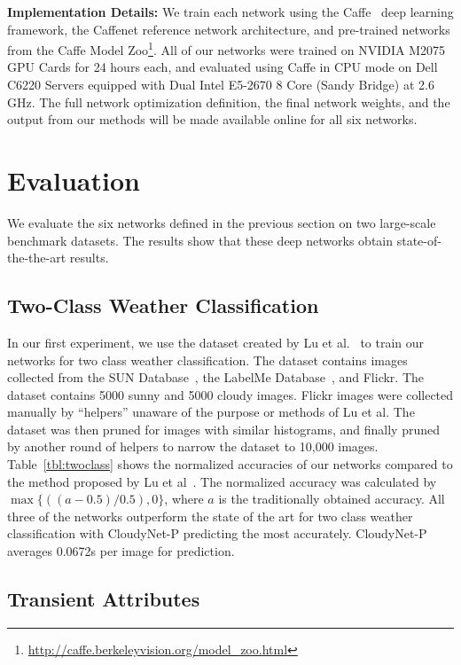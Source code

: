 \documentclass{article}
\newcommand{\tblref}[1]{Table~\ref{tbl:#1}}
\begin{document}
\textbf{Implementation Details:} We train each network using the
Caffe~\cite{caffe14} deep learning framework, the Caffenet
reference network architecture, and pre-trained networks from the
Caffe Model
Zoo\footnote{\url{http://caffe.berkeleyvision.org/model_zoo.html}}.
All of our networks were trained on NVIDIA M2075 GPU Cards for 24 hours
each, and evaluated using Caffe in CPU mode on Dell C6220 Servers 
equipped with Dual Intel E5-2670 8 Core (Sandy Bridge) at 2.6 GHz.
The full network optimization definition, the final network weights, 
and the output from our methods will be made available online for all
six networks.

\section{Evaluation}
\indent

We evaluate the six networks defined in the previous section on two
large-scale benchmark datasets. The results show that these deep
networks obtain state-of-the-the-art results. 

\subsection{Two-Class Weather Classification}
\indent

In our first experiment, we use the dataset created by Lu et al.~\cite{lutwoclass} to train
our networks for two class weather classification.  The dataset
contains images collected from the SUN Database~\cite{xiaoSUN}, the
LabelMe Database~\cite{russell2008labelme}, and Flickr. The dataset
contains 5000 sunny and 5000 cloudy images. Flickr images were
collected manually by ``helpers'' unaware of the purpose or methods of
Lu et al. The dataset was then pruned for images with similar
histograms, and finally pruned by another round of helpers to narrow
the dataset to 10,000 images.  \tblref{twoclass} shows the normalized
accuracies of our networks compared to the method proposed by
Lu et al~\cite{lutwoclass}.  The normalized accuracy was calculated by
$ \max\{((a - 0.5) / 0.5), 0\} $, where $a$ is the traditionally
obtained accuracy. All three of the networks outperform the state of
the art for two class weather classification with CloudyNet-P
predicting the most accurately.  CloudyNet-P averages 0.0672s per
image for prediction. 

\subsection{Transient Attributes}
\indent
\end{document}
